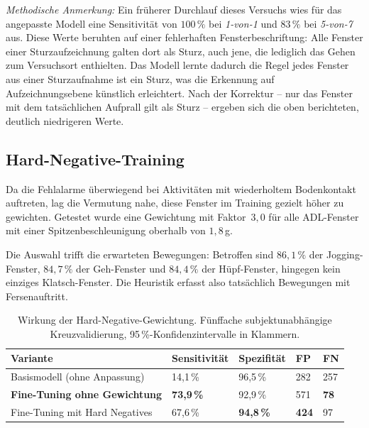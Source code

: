 \documentclass[11pt,a4paper,oneside]{report}
\begin{document}
\medskip
\noindent\textit{Methodische Anmerkung:} Ein früherer Durchlauf
dieses Versuchs wies für das angepasste Modell eine Sensitivität von
$100\,\%$ bei \emph{1-von-1} und $83\,\%$ bei \emph{5-von-7} aus.
Diese Werte beruhten auf einer fehlerhaften Fensterbeschriftung: Alle
Fenster einer Sturzaufzeichnung galten dort als Sturz, auch jene, die
lediglich das Gehen zum Versuchsort enthielten. Das Modell lernte
dadurch die Regel \glqq jedes Fenster aus einer Sturzaufnahme ist
ein Sturz\grqq{}, was die Erkennung auf Aufzeichnungsebene künstlich
erleichtert. Nach der Korrektur -- nur das Fenster mit dem
tatsächlichen Aufprall gilt als Sturz -- ergeben sich die oben
berichteten, deutlich niedrigeren Werte.

\subsection{Hard-Negative-Training}
\label{sec:hardneg}

Da die Fehlalarme überwiegend bei Aktivitäten mit wiederholtem
Bodenkontakt auftreten, lag die Vermutung nahe, diese Fenster im
Training gezielt höher zu gewichten. Getestet wurde eine Gewichtung
mit Faktor~$3{,}0$ für alle ADL-Fenster mit einer
Spitzenbeschleunigung oberhalb von $1{,}8$\,g.

Die Auswahl trifft die erwarteten Bewegungen: Betroffen sind
$86{,}1\,\%$ der Jogging-Fenster, $84{,}7\,\%$ der Geh-Fenster und
$84{,}4\,\%$ der Hüpf-Fenster, hingegen kein einziges Klatsch-Fenster.
Die Heuristik erfasst also tatsächlich Bewegungen mit
Fersenauftritt.

\begin{table}[H]
\centering
\caption{Wirkung der Hard-Negative-Gewichtung. Fünffache
         subjektunabhängige Kreuzvalidierung, 95\,\%-Konfidenz\-intervalle
         in Klammern.}
\label{tab:hardneg}
\small
\begin{tabularx}{\textwidth}{X C{2.9cm} C{2.9cm} C{1.1cm} C{1.1cm}}
\toprule
\textbf{Variante} & \textbf{Sensitivität} & \textbf{Spezifität} & \textbf{FP} & \textbf{FN} \\
\midrule
Basismodell (ohne Anpassung) & 14,1\,\% \enskip [10,6; 18,4] & 96,5\,\% \enskip [96,1; 96,9] & 282 & 257 \\
\textbf{Fine-Tuning ohne Gewichtung} & \textbf{73,9\,\% \enskip [68,7; 78,6]} & 92,9\,\% \enskip [92,3; 93,5] & 571 & \textbf{78} \\
Fine-Tuning mit Hard Negatives & 67,6\,\% \enskip [62,1; 72,6] & \textbf{94,8\,\% \enskip [94,2; 95,2]} & \textbf{424} & 97 \\
\bottomrule
\end{tabularx}
\end{table}
\end{document}
